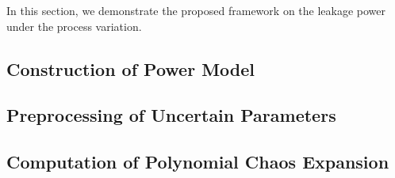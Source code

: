 In this section, we demonstrate the proposed framework on the leakage power under the process variation.

\subsection{Construction of Power Model} 


\subsection{Preprocessing of Uncertain Parameters} 


\subsection{Computation of Polynomial Chaos Expansion} 

